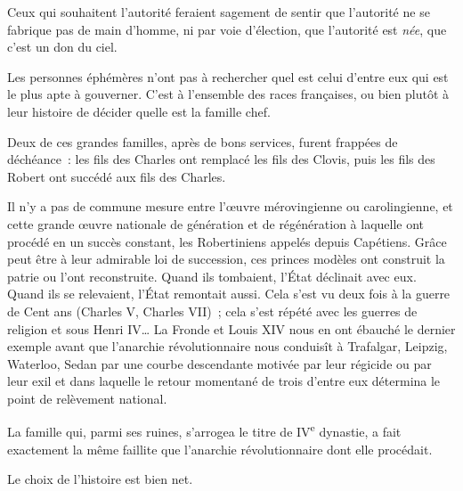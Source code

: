 \documentclass[french,twoside]{book} %
\newcommand{\astermono}{\medskip\centerline{\color{rubric}\large\selectfont{\syms ✻}}\medskip\par}%
\begin{document}
\astermono

\noindent Ceux qui souhaitent l’autorité feraient sagement de sentir que l’autorité ne se fabrique pas de main d’homme, ni par voie d’élection, que l’autorité est \emph{née}, que c’est un don du ciel.\par
Les personnes éphémères n’ont pas à rechercher quel est celui d’entre eux qui est le plus apte à gouverner. C’est à l’ensemble des races françaises, ou bien plutôt à leur histoire de décider quelle est la famille chef.\par
Deux de ces grandes familles, après de bons services, furent frappées de déchéance : les fils des Charles ont remplacé les fils des Clovis, puis les fils des Robert ont succédé aux fils des Charles.\par
Il n’y a pas de commune mesure entre l’œuvre mérovingienne ou carolingienne, et cette grande œuvre nationale de génération et de régénération à laquelle ont procédé en un succès constant, les Robertiniens appelés depuis Capétiens. Grâce peut être à leur admirable loi de succession, ces princes modèles ont construit la patrie ou l’ont reconstruite. Quand ils tombaient, l’État déclinait avec eux. Quand ils se relevaient, l’État remontait aussi. Cela s’est vu deux fois à la guerre de Cent ans (Charles V, Charles VII) ; cela s’est répété avec les guerres de religion et sous Henri IV… La Fronde et Louis XIV nous en ont ébauché le dernier exemple avant que l’anarchie révolutionnaire nous conduisît à Trafalgar, Leipzig, Waterloo, Sedan par une courbe descendante motivée par leur régicide ou par leur exil et dans laquelle le retour momentané de trois d’entre eux détermina le point de relèvement national.\par
La famille qui, parmi ses ruines, s’arrogea le titre de IV\textsuperscript{e} dynastie, a fait exactement la même faillite que l’anarchie révolutionnaire dont elle procédait.\par
Le choix de l’histoire est bien net.
\end{document}
